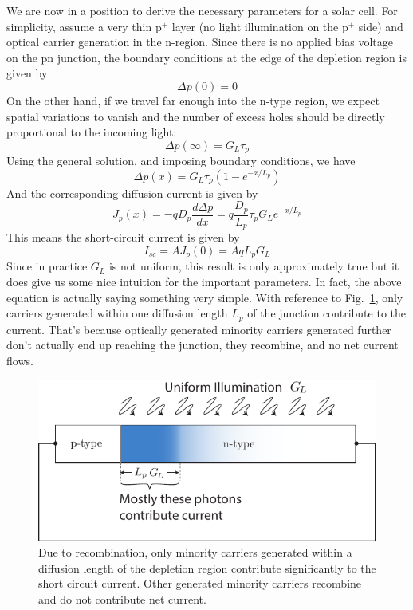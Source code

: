 We are now in a position to derive the necessary parameters for a solar cell.   For simplicity, assume a very thin p$^+$ layer (no light illumination on the p$^+$ side) and optical carrier generation in the n-region.  Since there is no applied bias voltage on the pn junction, the boundary conditions at the edge of the depletion region is given by
\begin{equation} 
	\Delta p(0) = 0  
\end{equation}
On the other hand, if we travel far enough into the n-type region, we expect spatial variations to vanish and the number of excess holes should be directly proportional to the incoming light:
\begin{equation} 
	\Delta p(\infty) = G_L \tau_p  
\end{equation}
Using the general solution, and imposing boundary conditions, we have 
\begin{equation} 
	\Delta p(x) = G_L \tau_p \left(1 - e^{-x/L_p} \right)   
\end{equation}
 And the corresponding diffusion current is given by
\begin{equation} 
	J_p(x) = - q D_p \frac{d \Delta p}{dx} = q \frac{D_p}{L_p}  \tau_p G_L  e^{-x/L_p}  
\end{equation}
This means the short-circuit current is given by
\begin{equation} 
	I_{sc} = A J_p(0) = A q L_p G_L 
\end{equation}
Since in practice $G_L$ is not uniform, this result is only approximately true but it does give us some nice intuition for the important parameters.   In fact, the above equation is actually saying something very simple.  With reference to Fig.~\ref{fig:solar_cell_region}, only carriers generated within one diffusion length $L_p$ of the junction contribute to the current.  That's because optically generated minority carriers generated further don't actually end up reaching the junction, they recombine, and no net current flows.
\begin{figure}[tb]
\begin{center}
\includegraphics[width=.5\columnwidth]{solar_cell_region}
\end{center}
\caption{Due to recombination, only minority carriers generated within a diffusion length of the depletion region contribute significantly to the short circuit current.  Other generated minority carriers recombine and do not contribute net current.}
\label{fig:solar_cell_region}
\end{figure}
